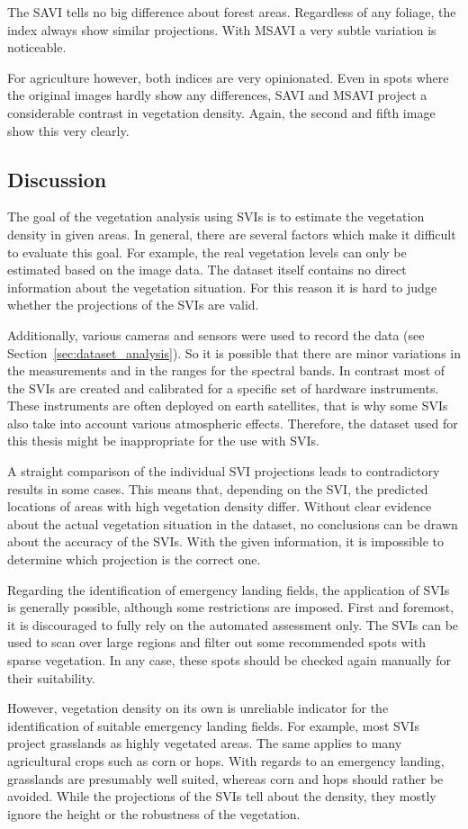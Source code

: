 The SAVI tells no big difference about forest areas. Regardless of any foliage, the index always show similar projections. With MSAVI a very subtle variation is noticeable.

For agriculture however, both indices are very opinionated. Even in spots where the original images hardly show any differences, SAVI and MSAVI project a considerable contrast in vegetation density. Again, the second and fifth image show this very clearly.

\subsection{Discussion}
The goal of the vegetation analysis using SVIs is to estimate the vegetation density in given areas. In general, there are several factors which make it difficult to evaluate this goal. For example, the real vegetation levels can only be estimated based on the image data. The dataset itself contains no direct information about the vegetation situation. For this reason it is hard to judge whether the projections of the SVIs are valid.

Additionally, various cameras and sensors were used to record the data (see Section~\ref{sec:dataset_analysis}). So it is possible that there are minor variations in the measurements and in the ranges for the spectral bands. In contrast most of the SVIs are created and calibrated for a specific set of hardware instruments. These instruments are often deployed on earth satellites, that is why some SVIs also take into account various atmospheric effects. Therefore, the dataset used for this thesis might be inappropriate for the use with SVIs.

A straight comparison of the individual SVI projections leads to contradictory results in some cases. This means that, depending on the SVI, the predicted locations of areas with high vegetation density differ. Without clear evidence about the actual vegetation situation in the dataset, no conclusions can be drawn about the accuracy of the SVIs. With the given information, it is impossible to determine which projection is the correct one.

Regarding the identification of emergency landing fields, the application of SVIs is generally possible, although some restrictions are imposed. First and foremost, it is discouraged to fully rely on the automated assessment only. The SVIs can be used to scan over large regions and filter out some recommended spots with sparse vegetation. In any case, these spots should be checked again manually for their suitability.

However, vegetation density on its own is unreliable indicator for the identification of suitable emergency landing fields. For example, most SVIs project grasslands as highly vegetated areas. The same applies to many agricultural crops such as corn or hops. With regards to an emergency landing, grasslands are presumably well suited, whereas corn and hops should rather be avoided. While the projections of the SVIs tell about the density, they mostly ignore the height or the robustness of the vegetation.

\clearpage
